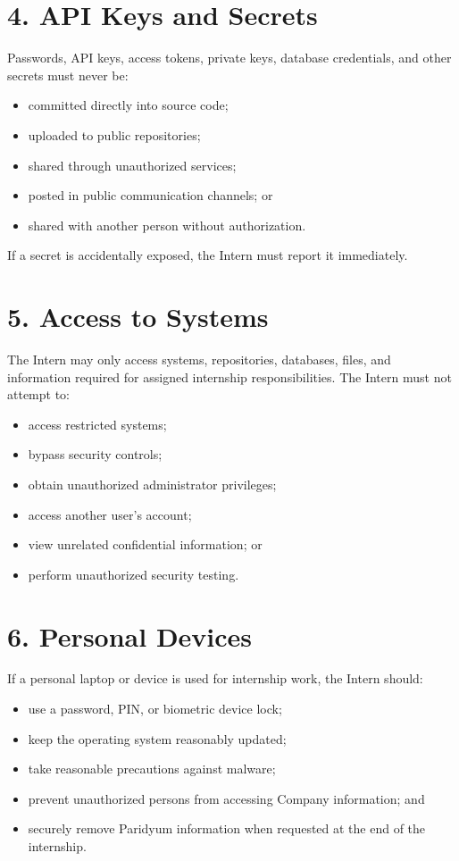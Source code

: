 \documentclass{paridyum}
\begin{document}
\section*{4. API Keys and Secrets}
Passwords, API keys, access tokens, private keys, database credentials, and other
secrets must never be:
\begin{itemize}[leftmargin=*, noitemsep]
    \item committed directly into source code;
    \item uploaded to public repositories;
    \item shared through unauthorized services;
    \item posted in public communication channels; or
    \item shared with another person without authorization.
\end{itemize}
If a secret is accidentally exposed, the Intern must report it immediately.

\section*{5. Access to Systems}
The Intern may only access systems, repositories, databases, files, and information
required for assigned internship responsibilities. The Intern must not attempt to:
\begin{itemize}[leftmargin=*, noitemsep]
    \item access restricted systems;
    \item bypass security controls;
    \item obtain unauthorized administrator privileges;
    \item access another user's account;
    \item view unrelated confidential information; or
    \item perform unauthorized security testing.
\end{itemize}

\section*{6. Personal Devices}
If a personal laptop or device is used for internship work, the Intern should:
\begin{itemize}[leftmargin=*, noitemsep]
    \item use a password, PIN, or biometric device lock;
    \item keep the operating system reasonably updated;
    \item take reasonable precautions against malware;
    \item prevent unauthorized persons from accessing Company information; and
    \item securely remove Paridyum information when requested at the end of the
          internship.
\end{itemize}
\end{document}

